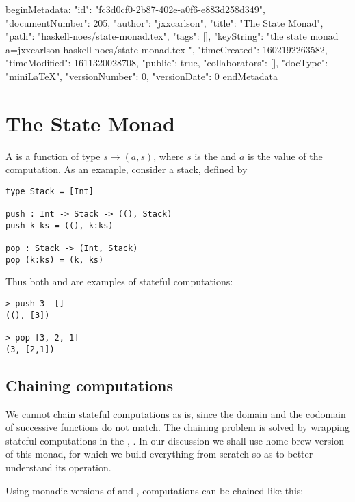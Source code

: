 beginMetadata:
{
    "id": "fc3d0cf0-2b87-402e-a0f6-e883d258d349",
    "documentNumber": 205,
    "author": "jxxcarlson",
    "title": "The State Monad",
    "path": "haskell-noes/state-monad.tex",
    "tags": [],
    "keyString": "the state monad a=jxxcarlson haskell-noes/state-monad.tex ",
    "timeCreated": 1602192263582,
    "timeModified": 1611320028708,
    "public": true,
    "collaborators": [],
    "docType": "miniLaTeX",
    "versionNumber": 0,
    "versionDate": 0
}
endMetadata
\setcounter{section}{4}

\section{The State Monad}

\innertableofcontents

A  is a function of type $s \to (a,s)$, where $s$ is the  and $a$ is the value of the computation.  As an example, consider a stack, defined by

\begin{verbatim}
type Stack = [Int]

push : Int -> Stack -> ((), Stack)
push k ks = ((), k:ks)

pop : Stack -> (Int, Stack)
pop (k:ks) = (k, ks)
\end{verbatim}

Thus both  and  are examples of stateful computations:

\begin{verbatim}
> push 3  []
((), [3])

> pop [3, 2, 1]
(3, [2,1])
\end{verbatim}


\subsection{Chaining computations}

We cannot chain stateful computations as is, since the domain and the codomain of successive functions do not match.  The chaining problem is solved by wrapping stateful computations in the , .  In our discussion we shall use home-brew version of this monad,  for which we build everything from scratch so as to better understand its operation.

Using monadic versions of  and , computations can be chained like this:


